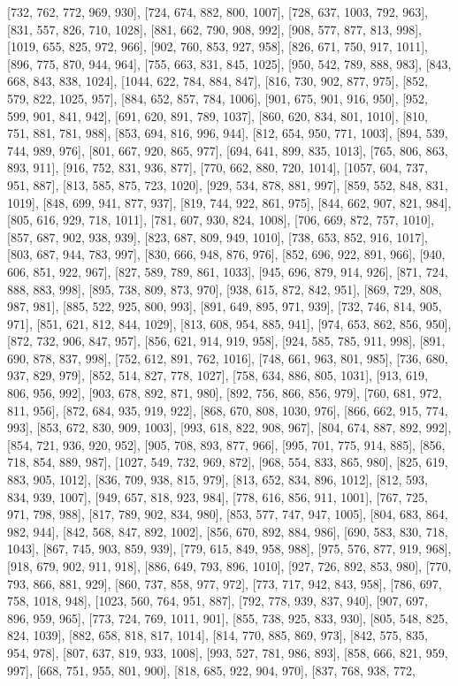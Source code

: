 [732, 762, 772, 969, 930], [724, 674, 882, 800, 1007], [728, 637, 1003, 792, 963], [831, 557, 826, 710, 1028], [881, 662, 790, 908, 992], [908, 577, 877, 813, 998], [1019, 655, 825, 972, 966], [902, 760, 853, 927, 958], [826, 671, 750, 917, 1011], [896, 775, 870, 944, 964], [755, 663, 831, 845, 1025], [950, 542, 789, 888, 983], [843, 668, 843, 838, 1024], [1044, 622, 784, 884, 847], [816, 730, 902, 877, 975], [852, 579, 822, 1025, 957], [884, 652, 857, 784, 1006], [901, 675, 901, 916, 950], [952, 599, 901, 841, 942], [691, 620, 891, 789, 1037], [860, 620, 834, 801, 1010], [810, 751, 881, 781, 988], [853, 694, 816, 996, 944], [812, 654, 950, 771, 1003], [894, 539, 744, 989, 976], [801, 667, 920, 865, 977], [694, 641, 899, 835, 1013], [765, 806, 863, 893, 911], [916, 752, 831, 936, 877], [770, 662, 880, 720, 1014], [1057, 604, 737, 951, 887], [813, 585, 875, 723, 1020], [929, 534, 878, 881, 997], [859, 552, 848, 831, 1019], [848, 699, 941, 877, 937], [819, 744, 922, 861, 975], [844, 662, 907, 821, 984], [805, 616, 929, 718, 1011], [781, 607, 930, 824, 1008], [706, 669, 872, 757, 1010], [857, 687, 902, 938, 939], [823, 687, 809, 949, 1010], [738, 653, 852, 916, 1017], [803, 687, 944, 783, 997], [830, 666, 948, 876, 976], [852, 696, 922, 891, 966], [940, 606, 851, 922, 967], [827, 589, 789, 861, 1033], [945, 696, 879, 914, 926], [871, 724, 888, 883, 998], [895, 738, 809, 873, 970], [938, 615, 872, 842, 951], [869, 729, 808, 987, 981], [885, 522, 925, 800, 993], [891, 649, 895, 971, 939], [732, 746, 814, 905, 971], [851, 621, 812, 844, 1029], [813, 608, 954, 885, 941], [974, 653, 862, 856, 950], [872, 732, 906, 847, 957], [856, 621, 914, 919, 958], [924, 585, 785, 911, 998], [891, 690, 878, 837, 998], [752, 612, 891, 762, 1016], [748, 661, 963, 801, 985], [736, 680, 937, 829, 979], [852, 514, 827, 778, 1027], [758, 634, 886, 805, 1031], [913, 619, 806, 956, 992], [903, 678, 892, 871, 980], [892, 756, 866, 856, 979], [760, 681, 972, 811, 956], [872, 684, 935, 919, 922], [868, 670, 808, 1030, 976], [866, 662, 915, 774, 993], [853, 672, 830, 909, 1003], [993, 618, 822, 908, 967], [804, 674, 887, 892, 992], [854, 721, 936, 920, 952], [905, 708, 893, 877, 966], [995, 701, 775, 914, 885], [856, 718, 854, 889, 987], [1027, 549, 732, 969, 872], [968, 554, 833, 865, 980], [825, 619, 883, 905, 1012], [836, 709, 938, 815, 979], [813, 652, 834, 896, 1012], [812, 593, 834, 939, 1007], [949, 657, 818, 923, 984], [778, 616, 856, 911, 1001], [767, 725, 971, 798, 988], [817, 789, 902, 834, 980], [853, 577, 747, 947, 1005], [804, 683, 864, 982, 944], [842, 568, 847, 892, 1002], [856, 670, 892, 884, 986], [690, 583, 830, 718, 1043], [867, 745, 903, 859, 939], [779, 615, 849, 958, 988], [975, 576, 877, 919, 968], [918, 679, 902, 911, 918], [886, 649, 793, 896, 1010], [927, 726, 892, 853, 980], [770, 793, 866, 881, 929], [860, 737, 858, 977, 972], [773, 717, 942, 843, 958], [786, 697, 758, 1018, 948], [1023, 560, 764, 951, 887], [792, 778, 939, 837, 940], [907, 697, 896, 959, 965], [773, 724, 769, 1011, 901], [855, 738, 925, 833, 930], [805, 548, 825, 824, 1039], [882, 658, 818, 817, 1014], [814, 770, 885, 869, 973], [842, 575, 835, 954, 978], [807, 637, 819, 933, 1008], [993, 527, 781, 986, 893], [858, 666, 821, 959, 997], [668, 751, 955, 801, 900], [818, 685, 922, 904, 970], [837, 768, 938, 772, 